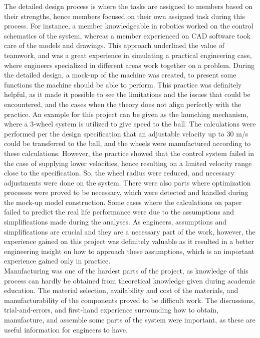 \documentclass[12pt]{report}
\begin{document}
The detailed design process is where the tasks are assigned to members based on their strengths, hence members focused on their own assigned task during this process. For instance, a member knowledgeable in robotics worked on the control schematics of the system, whereas a member experienced on CAD software took care of the models and drawings. This approach underlined the value of teamwork, and was a great experience in simulating a practical engineering case, where engineers specialized in different areas work together on a problem. During the detailed design, a mock-up of the machine was created, to present some functions the machine should be able to perform. This practice was definitely helpful, as it made it possible to see the limitations and the issues that could be encountered, and the cases when the theory does not align perfectly with the practice. An example for this project can be given as the launching mechanism, where a 3-wheel system is utilized to give speed to the ball. The calculations were performed per the design specification that an adjustable velocity up to 30 m/s could be transferred to the ball, and the wheels were manufactured according to these calculations. However, the practice showed that the control system failed in the case of supplying lower velocities, hence resulting on a limited velocity range close to the specification. So, the wheel radius were reduced, and necessary adjustments were done on the system. There were also parts where optimization processes were proved to be necessary, which were detected and handled during the mock-up model construction. Some cases where the calculations on paper failed to predict the real life performance were due to the assumptions and simplifications made during the analyses. As engineers, assumptions and simplifications are crucial and they are a necessary part of the work, however, the experience gained on this project was definitely valuable as it resulted in a better engineering insight on how to approach these assumptions, which is an important experience gained only in practice.\\

Manufacturing was one of the hardest parts of the project, as knowledge of this process can hardly be obtained from theoretical knowledge given during academic education. The material selection, availability and cost of the materials, and manufacturability of the components proved to be difficult work. The discussions, trial-and-errors, and first-hand experience surrounding how to obtain, manufacture, and assemble some parts of the system were important, as these are useful information for engineers to have.\\
\end{document}
